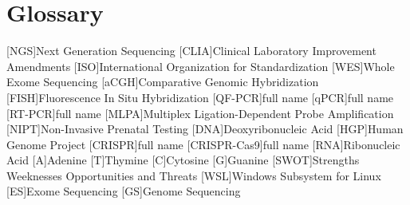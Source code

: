 \chapter{Glossary}

\footnotesize
\SingleSpacing

\begin{multicols}{2}
\begin{acronym}[AAAAAA]

	[NGS]{Next Generation Sequencing}
	[CLIA]{Clinical Laboratory Improvement Amendments}
	[ISO]{International Organization for Standardization}
	[WES]{Whole Exome Sequencing}
	[aCGH]{Comparative Genomic Hybridization}
	[FISH]{Fluorescence In Situ Hybridization}
	[QF-PCR]{full name}
	[qPCR]{full name}
	[RT-PCR]{full name}
	[MLPA]{Multiplex Ligation-Dependent Probe Amplification}
	[NIPT]{Non-Invasive Prenatal Testing}
	[DNA]{Deoxyribonucleic Acid}
	[HGP]{Human Genome Project}
	[CRISPR]{full name}
	[CRISPR-Cas9]{full name}
	[RNA]{Ribonucleic Acid}
	{Adenine}
	{Thymine}
	{Cytosine}
	{Guanine}
	[SWOT]{Strengths Weeknesses Opportunities and Threats}
	[WSL]{Windows Subsystem for Linux}
	[ES]{Exome Sequencing}
	[GS]{Genome Sequencing}


\end{acronym}
\end{multicols}

